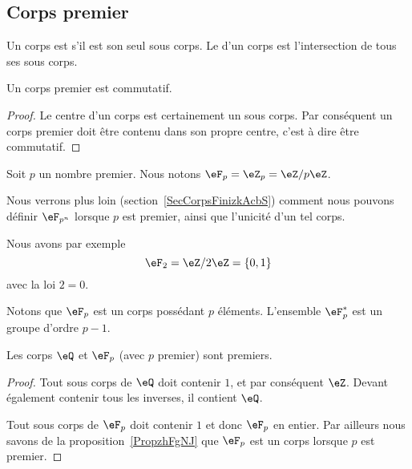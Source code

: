 \subsection{Corps premier}
\label{subseccorpspremhBlYIv}

\begin{definition}
    Un corps est  s'il est son seul sous corps. Le  d'un corps est l'intersection de tous ses sous corps.
\end{definition}

\begin{lemma}
    Un corps premier est commutatif.
\end{lemma}

\begin{proof}
    Le centre d'un corps est certainement un sous corps. Par conséquent un corps premier doit être contenu dans son propre centre, c'est à dire être commutatif.
\end{proof}

\begin{definition}  \label{DefXIHLooBAcqYH}
Soit \( p\) un nombre premier. Nous notons \( \eF_p=\eZ_p=\eZ/p\eZ\).
\end{definition}

Nous verrons plus loin (section~\ref{SecCorpsFinizkAcbS}) comment nous pouvons définir \( \eF_{p^n}\) lorsque \( p\) est premier, ainsi que l'unicité d'un tel corps.

Nous avons par exemple
\begin{equation}
    \eF_2=\eZ/2\eZ=\{ 0,1 \}
\end{equation}
avec la loi \( 2=0\).

Notons que \( \eF_p\) est un corps possédant \( p\) éléments. L'ensemble \( \eF_p^*\) est un groupe d'ordre \( p-1\).

\begin{lemma}
    Les corps \( \eQ\) et \( \eF_p\) (avec \( p\) premier) sont premiers.
\end{lemma}

\begin{proof}
    Tout sous corps de \( \eQ\) doit contenir \( 1\), et par conséquent \( \eZ\). Devant également contenir tous les inverses, il contient \( \eQ\).

    Tout sous corps de \(\eF_p \) doit contenir \( 1\) et donc \( \eF_p\) en entier. Par ailleurs nous savons de la proposition~\ref{PropzhFgNJ} que \( \eF_p\) est un corps lorsque \( p\) est premier.
\end{proof}

